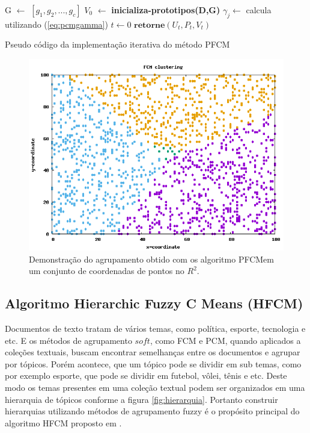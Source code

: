 \begin{algorithm}[H] 
  \SetAlgoLined {} 
  G $\gets$ $[g_1,g_2,...,g_c]$\; 
  $V_0$ $\gets$ \textbf{{\color{blue}inicializa-prototipos}(D,G)}\; 
  $\gamma_j \gets$ calcula utilizando (\ref{eq:pcmgamma})\;
  $t \gets 0$\; 
  $\textbf{retorne} (U_t,P_t,V_t)$\; 
  \caption{Pseudo código da implementação iterativa do método PFCM}
  \label{alg:pfcm} 
\end{algorithm}

\begin{figure}[!htp] 
  \centering 
  \includegraphics[width=0.6\columnwidth]{assets/samples_pfcm.png}
  \caption{Demonstração do agrupamento obtido com os algoritmo 
    PFCM\protect\footnotemark em um conjunto de coordenadas de pontos no $R^2$.} 
  \label{fig:samples_pfcm} 
\end{figure}

\subsection{Algoritmo Hierarchic Fuzzy C Means (HFCM)}
Documentos de texto tratam de vários temas, como política, esporte, tecnologia e etc.
E os métodos de agrupamento $soft$, como FCM e PCM, quando aplicados a coleções textuais, buscam
encontrar semelhanças entre os documentos e agrupar por tópicos. Porém acontece, que um
tópico pode se dividir em sub temas, como por exemplo esporte, que pode se dividir em futebol,
vôlei, tênis e etc. Deste modo os temas presentes em uma coleção textual podem ser organizados 
em uma hierarquia de tópicos conforme a figura \ref{fig:hierarquia}. Portanto construir hierarquias
utilizando métodos de agrupamento fuzzy é o propósito principal do algoritmo HFCM proposto em
\cite{PedryczR2006}.

